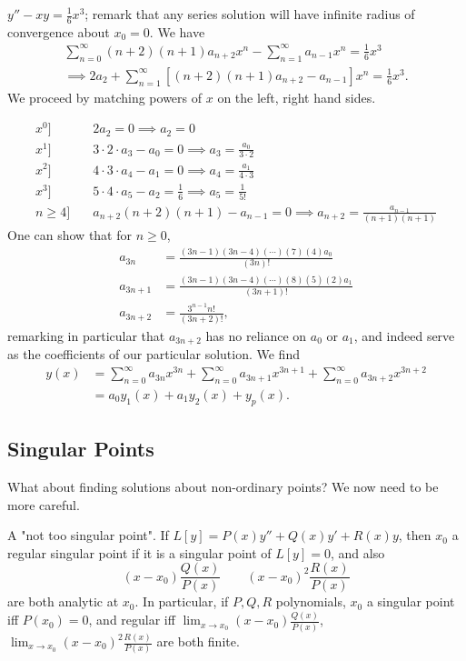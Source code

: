 \begin{example}
    $y'' - xy = \frac{1}{6}x^3$; remark that any series solution will have infinite radius of convergence about $x_0 = 0$. We have \begin{align*}
    \sum_{n=0}^\infty (n+2)(n+1)a_{n+2} x^{n} - \sum_{n=1}^\infty   a_{n-1}x^n = \frac{1}{6}x^3\\
    \implies 2a_2 + \sum_{n=1}^\infty [(n+2)(n+1)a_{n+2} - a_{n-1}]x^n = \frac{1}{6}x^{3}.
    \end{align*}
    We proceed by matching powers of $x$ on the left, right hand sides.

    \begin{align*}
        x^0]\quad & 2a_2 = 0 \implies a_2 = 0\\
        x^1]\quad& 3 \cdot 2 \cdot a_3 - a_0 = 0 \implies a_3 = \frac{a_0}{3 \cdot 2}\\
        x^2]\quad & 4 \cdot 3 \cdot a_4 - a_1 = 0 \implies a_4 = \frac{a_1}{4 \cdot 3}\\
        x^3]\quad & 5 \cdot 4 \cdot a_5 - a_2 = \frac{1}{6} \implies a_5 = \frac{1}{5!}\\
        n \geq 4]\quad & a_{n+2}(n+2)(n+1) - a_{n-1} = 0 \implies a_{n+2} = \frac{a_{n-1}}{(n+1)(n+1)}
    \end{align*}
One can show that for $n \geq 0$, \begin{align*}
    a_{3n} &= \frac{(3n-1)(3n-4)(\cdots)(7)(4)a_0}{(3n)!}\\
    a_{3n+1} &= \frac{(3n-1)(3n-4)(\cdots)(8)(5)(2)a_1}{(3n+1)!}\\
    a_{3n+2} &= \frac{3^{n-1}n!}{(3n+2)!},
\end{align*}
remarking in particular that $a_{3n+2}$ has no reliance on $a_0$ or $a_1$, and indeed serve as the coefficients of our particular solution. We find \begin{align*}
    y(x) &= \sum_{n=0}^\infty a_{3n} x^{3n} + \sum_{n=0}^\infty a_{3n+1}x^{3n+1} + \sum_{n=0}^\infty a_{3n+2} x^{3n+2}\\
    &= a_0 y_1(x) + a_1 y_2(x) + y_p(x).
\end{align*}
\end{example}

\subsection{Singular Points}

What about finding solutions about non-ordinary points? We now need to be more careful.

\begin{definition}
    A "not too singular point". If $L[y] = P(x)y'' + Q(x)y' + R(x)y$, then $x_0$ a regular singular point if it is a singular point of $L[y] = 0$, and also \[
    (x-x_0) \frac{Q(x)}{P(x)}    \qquad (x-x_0)^2 \frac{R(x)}{P(x)}
    \]
    are both analytic at $x_0$. In particular, if $P, Q, R$ polynomials, $x_0$ a singular point iff $P(x_0) = 0$, and regular iff $\lim_{x \to x_0} (x-x_0) \frac{Q(x)}{P(x)}$, $\lim_{x \to x_0} (x-x_0)^2 \frac{R(x)}{P(x)}$ are both finite.
\end{definition}